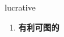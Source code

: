 
\begin{frame}
{\huge lucrative}
\begin{center}
\begin{enumerate}\Large
  \item \textbf{有利可图的}
\end{enumerate}
\end{center}
\end{frame}
